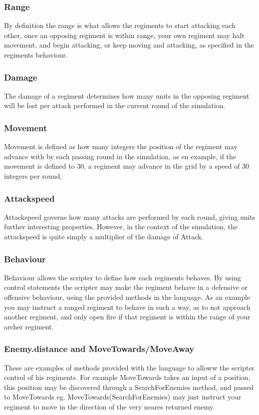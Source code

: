 				\subsubsection{Range}
				By definition the range is what allows the regiments to start attacking each other, once an opposing regiment is within range, your own regiment may halt movement, and begin attacking, or keep moving and attacking, as specified in the regiments behaviour.
					\subsubsection{Damage}
					The damage of a regiment determines how many units in the opposing regiment will be lost per attack performed in the current round of the simulation.
						\subsubsection{Movement}
						Movement is defined as how many integers the position of the regiment may advance with by each passing round in the simulation, as en example, if the movement is defined to 30, a regiment may advance in the grid by a speed of 30 integers per round.
							\subsubsection{Attackspeed}
							Attackspeed governs how many attacks are performed by each round, giving units further interesting properties. However, in the context of the simulation, the attackspeed is quite simply a multiplier of the damage of Attack.
								\subsubsection{Behaviour}
								Behaviour allows the scripter to define how each regiments behaves. By using control statements the scripter may make the regiment behave in a defensive or offensive behaviour, using the provided methods in the language. As an example you may instruct a ranged regiment to behave in such a way, as to not approach another regiment, and only open fire if that regiment is within the range of your archer regiment.
								\subsubsection{Enemy.distance and MoveTowards/MoveAway}
								These are examples of methods provided with the language to alloww the scripter control of his regiments.
								For example MoveTowards takes an input of a position, this position may be discovered through a SearchForEnemies method, and passed to MoveTowards eg. MoveTowards(SearchForEnemies) may just instruct your regiment to move in the direction of the very neares returned enemy.
